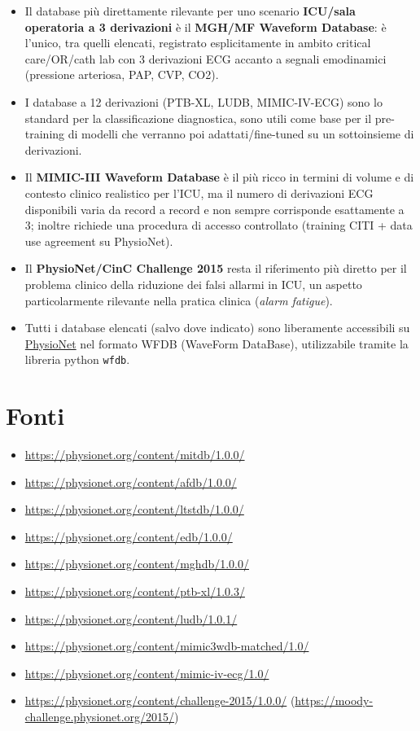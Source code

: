 \documentclass[11pt,a4paper]{article}
\begin{document}
\begin{itemize}[leftmargin=1.2em]
    \item Il database più direttamente rilevante per uno scenario \textbf{ICU/sala operatoria a 3 derivazioni} è il \textbf{MGH/MF Waveform Database}: è l'unico, tra quelli elencati, registrato esplicitamente in ambito critical care/OR/cath lab con 3 derivazioni ECG accanto a segnali emodinamici (pressione arteriosa, PAP, CVP, CO2).
    \item I database a 12 derivazioni (PTB-XL, LUDB, MIMIC-IV-ECG) sono lo standard per la classificazione diagnostica, sono utili come base per il pre-training di modelli che verranno poi adattati/fine-tuned su un sottoinsieme di derivazioni.
    \item Il \textbf{MIMIC-III Waveform Database} è il più ricco in termini di volume e di contesto clinico realistico per l'ICU, ma il numero di derivazioni ECG disponibili varia da record a record e non sempre corrisponde esattamente a 3; inoltre richiede una procedura di accesso controllato (training CITI + data use agreement su PhysioNet).
    \item Il \textbf{PhysioNet/CinC Challenge 2015} resta il riferimento più diretto per il problema clinico della riduzione dei falsi allarmi in ICU, un aspetto particolarmente rilevante nella pratica clinica (\emph{alarm fatigue}).
    \item Tutti i database elencati (salvo dove indicato) sono liberamente accessibili su \href{https://physionet.org}{PhysioNet} nel formato WFDB (WaveForm DataBase), utilizzabile tramite la libreria python  \texttt{wfdb}.
\end{itemize}

\section*{Fonti}
\begin{itemize}[leftmargin=1.2em]
    \item \url{https://physionet.org/content/mitdb/1.0.0/}
    \item \url{https://physionet.org/content/afdb/1.0.0/}
    \item \url{https://physionet.org/content/ltstdb/1.0.0/}
    \item \url{https://physionet.org/content/edb/1.0.0/}
    \item \url{https://physionet.org/content/mghdb/1.0.0/}
    \item \url{https://physionet.org/content/ptb-xl/1.0.3/}
    \item \url{https://physionet.org/content/ludb/1.0.1/}
    \item \url{https://physionet.org/content/mimic3wdb-matched/1.0/}
    \item \url{https://physionet.org/content/mimic-iv-ecg/1.0/}
    \item \url{https://physionet.org/content/challenge-2015/1.0.0/} (\url{https://moody-challenge.physionet.org/2015/})
\end{itemize}
\end{document}
